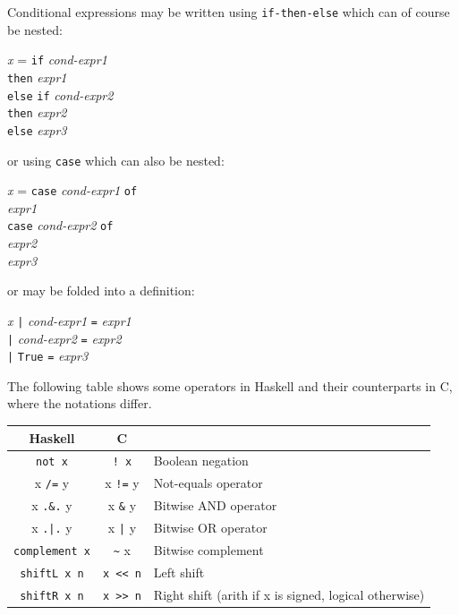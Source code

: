 \documentclass[11pt]{article}
\newcommand{\hmm}{\hspace*{2em}}
\newcommand{\hmmm}{\hspace*{3em}}
\begin{document}
Conditional expressions may be written using \verb|if-then-else| which can of course be nested:
\begin{tabbing}
\hmmm \= \emph{x} = \= {\tt if} \emph{cond-expr1} \\
      \>            \> {\tt then} \emph{expr1} \\
      \>            \> {\tt else} \= {\tt if} \emph{cond-expr2} \\
      \>            \>            \> {\tt then} \emph{expr2} \\
      \>            \>            \> {\tt else} \emph{expr3}
\end{tabbing}
or using \verb|case| which can also be nested:
\begin{tabbing}
\hmmm \= \emph{x} = \= {\tt case} \emph{cond-expr1} {\tt of}\\
      \>            \> \hmm {\tt True -> } \emph{expr1} \\
      \>            \> \hmm {\tt False ->} \= {\tt case} \emph{cond-expr2} {\tt of}\\
      \>            \>                     \> \hmm {\tt True ->} \emph{expr2} \\
      \>            \>                     \> \hmm {\tt False ->} \emph{expr3}
\end{tabbing}
or may be folded into a definition:
\begin{tabbing}
\hmmm \= \emph{x} \= {\tt |} \emph{cond-expr1} \= {\tt =} \emph{expr1} \\
      \>          \> {\tt |} \emph{cond-expr2} \> {\tt =} \emph{expr2} \\
      \>          \> {\tt |} {\tt True}        \> {\tt =} \emph{expr3}
\end{tabbing}

The following table shows some operators in Haskell and their
counterparts in C, where the notations differ.

\begin{tabular}{|c|c|l|}
\hline
Haskell           & C             & \\
\hline
\verb|not x|        & \verb|! x|    & Boolean negation \\
x \verb|/=| y       & x \verb|!=| y & Not-equals operator \\
x \verb|.&.| y      & x \verb|&| y  & Bitwise AND operator \\
x \verb/.|./ y      & x \verb/|/ y  & Bitwise OR operator \\
\verb|complement x| & \verb|~| x    & Bitwise complement \\
\verb|shiftL x n|   & \verb|x << n| & Left shift  \\
\verb|shiftR x n|   & \verb|x >> n| & Right shift (arith if x is signed, logical otherwise) \\
\hline
\end{tabular}

\end{document}
